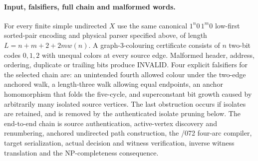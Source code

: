 \documentclass[11pt]{article}
\begin{document}
\paragraph{Input, falsifiers, full chain and malformed words.}
For every finite simple undirected $X$ use the same canonical
$1^n0\,1^m0$ low-first sorted-pair encoding and physical parser
specified above, of length
$L=n+m+2+2mw(n)$. A graph-3-colouring certificate consists of
$n$ two-bit codes $0,1,2$ with unequal colors at every source edge.
Malformed header, address, ordering, duplicate or trailing bits
produce INVALID. Four explicit falsifiers for the selected chain are:
an unintended fourth allowed colour under the two-edge anchored walk,
a length-three walk allowing equal endpoints, an anchor homomorphism
that folds the five-cycle, and superconstant bit growth caused by
arbitrarily many isolated source vertices. The last obstruction
occurs if isolates are retained, and is removed by the authenticated
isolate pruning below. The end-to-end chain is
source authentication, active-vertex discovery and renumbering,
anchored undirected path construction, the /072 four-arc compiler,
target serialization, actual decision and witness verification,
inverse witness translation and the NP-completeness consequence.
\end{document}
